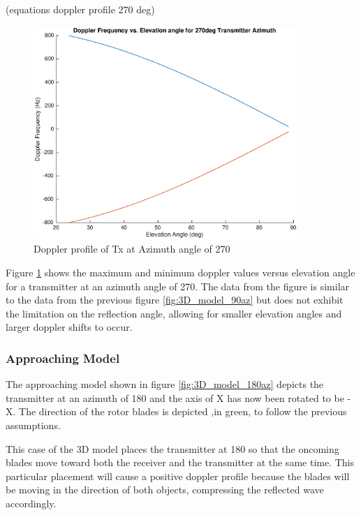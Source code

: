 (equations doppler profile 270 deg)

\begin{figure}
	\begin{center}
		\includegraphics[width=10cm]{images/background/3d_geometry_tx_270az_doppler_profile.eps}
		\caption{Doppler profile of Tx at Azimuth angle of 270\textdegree}
		\label{fig:3D_model_270az_doppler}
	\end{center}
\end{figure}

Figure \ref{fig:3D_model_270az_doppler} shows the maximum and minimum doppler values versus elevation angle for a transmitter at an azimuth angle of 270\textdegree. The data from the figure is similar to the data from the previous figure \ref{fig:3D_model_90az} but does not exhibit the limitation on the reflection angle, allowing for smaller elevation angles and larger doppler shifts to occur.

\subsubsection{Approaching Model}
The approaching model shown in figure \ref{fig:3D_model_180az} depicts the transmitter at an azimuth of 180 \textdegree \space and the axis of X has now been rotated to be -X. The direction of the rotor blades is depicted ,in green, to follow the previous assumptions.

This case of the 3D model places the transmitter at 180 \textdegree \space so that the oncoming blades move toward both the receiver and the transmitter at the same time. This particular placement will cause a positive doppler profile because the blades will be moving in the direction of both objects, compressing the reflected wave accordingly.

